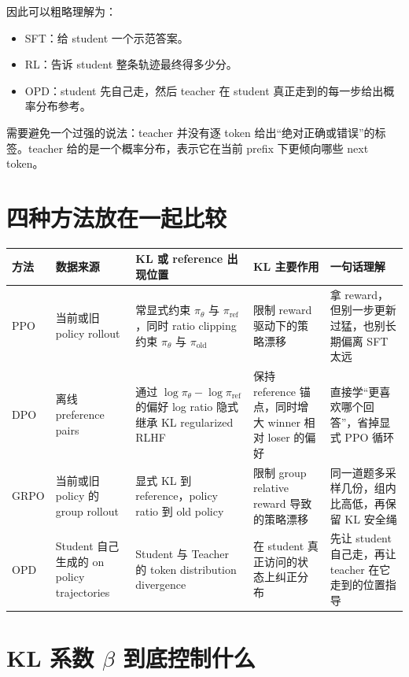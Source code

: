 \documentclass[11pt,a4paper]{ctexart}
\newcommand{\piold}{\pi_{\mathrm{old}}}
\newcommand{\piref}{\pi_{\mathrm{ref}}}
\newcommand{\pitheta}{\pi_{\theta}}
\begin{document}
因此可以粗略理解为：

\begin{itemize}
    \item SFT：给 student 一个示范答案。
    \item RL：告诉 student 整条轨迹最终得多少分。
    \item OPD：student 先自己走，然后 teacher 在 student 真正走到的每一步给出概率分布参考。
\end{itemize}

需要避免一个过强的说法：teacher 并没有逐 token 给出“绝对正确或错误”的标签。teacher 给的是一个概率分布，表示它在当前 prefix 下更倾向哪些 next token。

\section{四种方法放在一起比较}

\begin{center}
\small
\begin{tabular}{p{1.7cm}p{3.0cm}p{3.5cm}p{3.2cm}p{3.0cm}}
\toprule
方法 & 数据来源 & KL 或 reference 出现位置 & KL 主要作用 & 一句话理解 \\
\midrule
PPO
&
当前或旧 policy rollout
&
常显式约束 $\pitheta$ 与 $\piref$，同时 ratio clipping 约束 $\pitheta$ 与 $\piold$
&
限制 reward 驱动下的策略漂移
&
拿 reward，但别一步更新过猛，也别长期偏离 SFT 太远
\\
\addlinespace

DPO
&
离线 preference pairs
&
通过 $\log\pitheta-\log\piref$ 的偏好 log ratio 隐式继承 KL regularized RLHF
&
保持 reference 锚点，同时增大 winner 相对 loser 的偏好
&
直接学“更喜欢哪个回答”，省掉显式 PPO 循环
\\
\addlinespace

GRPO
&
当前或旧 policy 的 group rollout
&
显式 KL 到 reference，policy ratio 到 old policy
&
限制 group relative reward 导致的策略漂移
&
同一道题多采样几份，组内比高低，再保留 KL 安全绳
\\
\addlinespace

OPD
&
Student 自己生成的 on policy trajectories
&
Student 与 Teacher 的 token distribution divergence
&
在 student 真正访问的状态上纠正分布
&
先让 student 自己走，再让 teacher 在它走到的位置指导
\\
\bottomrule
\end{tabular}
\end{center}

\section{KL 系数 $\beta$ 到底控制什么}
\end{document}
